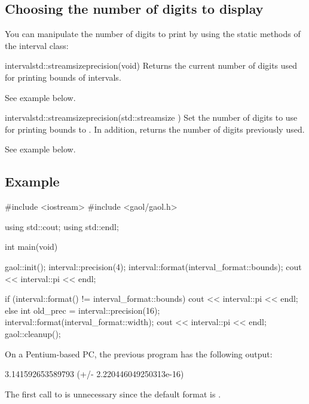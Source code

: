 \documentclass{manual}
\begin{document}
\subsection{Choosing the number of digits to display}
You can manipulate the number of digits to print by using the  static
methods of the interval class:

\begin{defmethod}{interval}{std::streamsize}{precision}{(void)}
Returns the current number of digits used for printing bounds
of intervals.

See example below.
\end{defmethod}

\begin{defmethod}{interval}{std::streamsize}{precision}{(std::streamsize )}
Set the number of digits to use for printing bounds to . In addition,
returns the number of digits previously used.

See example below.
\end{defmethod}


\subsection{Example}\label{sec:output-example}

\begin{example}
#include <iostream>
#include <gaol/gaol.h>

using std::cout;
using std::endl;

int main(void)
{
  gaol::init();
  interval::precision(4);
  interval::format(interval_format::bounds);
  cout << interval::pi << endl;

  if (interval::format() != interval_format::bounds) {
    cout << interval::pi << endl;
  } else {
    int old_prec = interval::precision(16);
    interval::format(interval_format::width);
    cout << interval::pi << endl;
  }
  gaol::cleanup();
}
\end{example}

\noindent
On a Pentium-based PC, the previous program has the following output:

\begin{onscreen}
[ 3.142, 3.142 ]
3.141592653589793 (+/- 2.220446049250313e-16)
\end{onscreen}

The first call to  is unnecessary
since the default format is .
\end{document}
